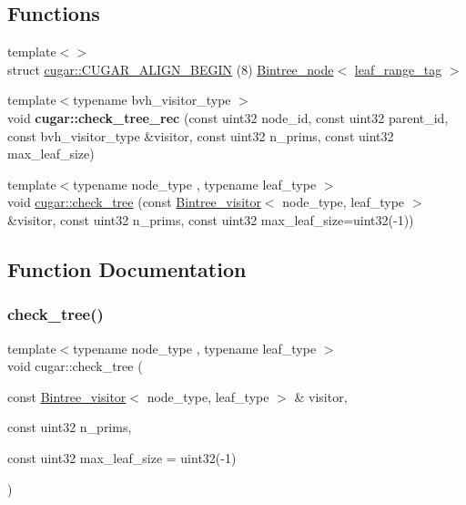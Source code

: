 \subsection*{Functions}
\begin{DoxyCompactItemize}
\item 
{\footnotesize template$<$$>$ }\\struct \hyperlink{group__bintree_ga15f38b4f0c951aae051440621b067dae}{cugar\+::\+C\+U\+G\+A\+R\+\_\+\+A\+L\+I\+G\+N\+\_\+\+B\+E\+G\+IN} (8) \hyperlink{structcugar_1_1_bintree__node}{Bintree\+\_\+node}$<$ \hyperlink{structcugar_1_1leaf__range__tag}{leaf\+\_\+range\+\_\+tag} $>$
\item 
\mbox{\label{group__bintree_ga6bb1185e3d62c115156210e8e0b1f80f}} 
{\footnotesize template$<$typename bvh\+\_\+visitor\+\_\+type $>$ }\\void {\bfseries cugar\+::check\+\_\+tree\+\_\+rec} (const uint32 node\+\_\+id, const uint32 parent\+\_\+id, const bvh\+\_\+visitor\+\_\+type \&visitor, const uint32 n\+\_\+prims, const uint32 max\+\_\+leaf\+\_\+size)
\item 
{\footnotesize template$<$typename node\+\_\+type , typename leaf\+\_\+type $>$ }\\void \hyperlink{group__bintree_ga70e603ed21666cc3c7fc15fde631c356}{cugar\+::check\+\_\+tree} (const \hyperlink{structcugar_1_1_bintree__visitor}{Bintree\+\_\+visitor}$<$ node\+\_\+type, leaf\+\_\+type $>$ \&visitor, const uint32 n\+\_\+prims, const uint32 max\+\_\+leaf\+\_\+size=uint32(-\/1))
\end{DoxyCompactItemize}


\subsection{Function Documentation}
\mbox{\label{group__bintree_ga70e603ed21666cc3c7fc15fde631c356}} 
\subsubsection{\texorpdfstring{check\+\_\+tree()}{check\_tree()}}
{\footnotesize\ttfamily template$<$typename node\+\_\+type , typename leaf\+\_\+type $>$ \\
void cugar\+::check\+\_\+tree (\begin{DoxyParamCaption}\item[{const \hyperlink{structcugar_1_1_bintree__visitor}{Bintree\+\_\+visitor}$<$ node\+\_\+type, leaf\+\_\+type $>$ \&}]{visitor,  }\item[{const uint32}]{n\+\_\+prims,  }\item[{const uint32}]{max\+\_\+leaf\+\_\+size = {\ttfamily uint32(-\/1)} }\end{DoxyParamCaption})}

